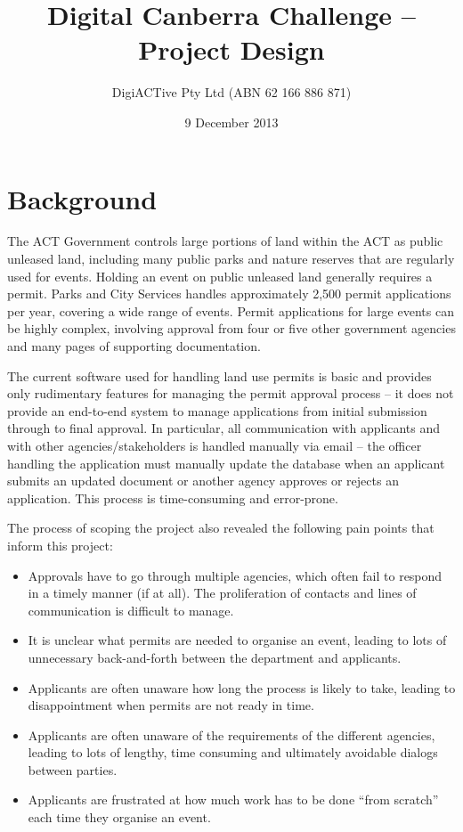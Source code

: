 \documentclass[12pt,a4paper,twosided]{article}
\title{Digital Canberra Challenge -- Project Design}
\author{DigiACTive Pty Ltd (ABN 62 166 886 871)}
\date{9 December 2013}
\begin{document}
\maketitle
\section{Background}

The ACT Government controls large portions of land within the ACT as
public unleased land, including many public parks and nature reserves
that are regularly used for events. Holding an event on public unleased
land generally requires a permit. Parks and City Services handles
approximately 2,500 permit applications per year, covering a wide range
of events. Permit applications for large events can be highly complex,
involving approval from four or five other government agencies and many
pages of supporting documentation.

The current software used for handling land use permits is basic and
provides only rudimentary features for managing the permit approval
process -- it does not provide an end-to-end system to manage
applications from initial submission through to final approval. In
particular, all communication with applicants and with other
agencies/stakeholders is handled manually via email -- the officer
handling the application must manually update the database when an
applicant submits an updated document or another agency approves or
rejects an application. This process is time-consuming and error-prone.

The process of scoping the project also revealed the following pain
points that inform this project:

\begin{itemize}
\itemsep1pt\parskip0pt
\item
  Approvals have to go through multiple agencies, which often fail to
  respond in a timely manner (if at all). The proliferation of contacts
  and lines of communication is difficult to manage.
\item
  It is unclear what permits are needed to organise an event, leading to
  lots of unnecessary back-and-forth between the department and
  applicants.
\item
  Applicants are often unaware how long the process is likely to take,
  leading to disappointment when permits are not ready in time.
\item
  Applicants are often unaware of the requirements of the different
  agencies, leading to lots of lengthy, time consuming and ultimately
  avoidable dialogs between parties.
\item
  Applicants are frustrated at how much work has to be done ``from
  scratch'' each time they organise an event.
\end{itemize}
\end{document}
